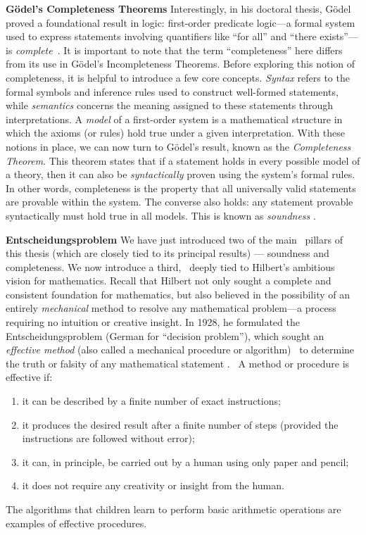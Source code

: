 \noindent \textbf{ Gödel’s Completeness Theorems} 
Interestingly, in his doctoral thesis, Gödel proved a foundational result in logic: first-order predicate logic---a formal system used to express statements involving quantifiers like ``for all'' and ``there exists''---is \emph{complete}~\cite{godelVollstandigkeitAxiomeLogischen1930}. It is important to note that the term ``completeness'' here differs from its use in Gödel’s Incompleteness Theorems.
Before exploring this notion of completeness, it is helpful to introduce a few core concepts. \emph{Syntax} refers to the formal symbols and inference rules used to construct well-formed statements, while \emph{semantics} concerns the meaning assigned to these statements through interpretations. A \emph{model} of a first-order system is a mathematical structure in which the axioms (or rules) hold true under a given interpretation.
With these notions in place, we can now turn to Gödel’s result, known as the \emph{Completeness Theorem}. This theorem states that  if a statement holds in every possible model of a theory, then it can also be \emph{syntactically} proven using the system’s formal rules. In other words, completeness is the property that all universally valid statements are provable within the system.  The converse also holds: any statement provable syntactically must hold true in all models. This is known as \emph{soundness} \cite{franzenGodelsTheorem2008}.
 


\noindent \textbf{Entscheidungsproblem}
We have just introduced two of the main  pillars of this thesis  (which are closely tied to its principal results) ---
soundness and completeness. We now introduce a third,  deeply tied to Hilbert's ambitious vision for mathematics. Recall that Hilbert not only sought a complete and consistent foundation for mathematics, but also believed in the possibility of an entirely \emph{mechanical} method to resolve any mathematical problem---a process requiring no intuition or creative insight. In 1928, he formulated the Entscheidungsproblem (German for “decision problem”), which sought an \emph{effective method} (also called a mechanical procedure or algorithm)  to determine the truth or falsity of any mathematical statement \cite{hilbert1928}.  A method or procedure is effective if:
\begin{enumerate}
\item it can be described by a finite number of exact instructions;
\item it produces the desired result after a finite number of steps (provided the instructions are followed without error);
\item it can, in principle, be carried out by a human using only paper and pencil;
\item it does not require any creativity or insight from the human.
\end{enumerate}
The algorithms that children learn to perform basic arithmetic operations are examples of effective procedures. 

